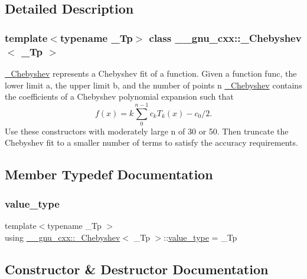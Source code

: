 \subsection{Detailed Description}
\subsubsection*{template$<$typename \+\_\+\+Tp$>$\newline
class \+\_\+\+\_\+gnu\+\_\+cxx\+::\+\_\+\+Chebyshev$<$ \+\_\+\+Tp $>$}

\hyperlink{class____gnu__cxx_1_1__Chebyshev}{\+\_\+\+Chebyshev} represents a Chebyshev fit of a function. Given a function {\ttfamily func}, the lower limit {\ttfamily a}, the upper limit {\ttfamily b}, and the number of points {\ttfamily n} \hyperlink{class____gnu__cxx_1_1__Chebyshev}{\+\_\+\+Chebyshev} contains the coefficients of a Chebyshev polynomial expansion such that \[ f(x) = k\sum_{0}^{n-1} c_k T_k(x) - c_0/2. \] Use these constructors with moderately large n of 30 or 50. Then truncate the Chebyshev fit to a smaller number of terms to satisfy the accuracy requirements. 

\subsection{Member Typedef Documentation}
\mbox{\label{class____gnu__cxx_1_1__Chebyshev_a7346ba5843311126dc28cb905687c4a1}} 
\subsubsection{\texorpdfstring{value\+\_\+type}{value\_type}}
{\footnotesize\ttfamily template$<$typename \+\_\+\+Tp $>$ \\
using \hyperlink{class____gnu__cxx_1_1__Chebyshev}{\+\_\+\+\_\+gnu\+\_\+cxx\+::\+\_\+\+Chebyshev}$<$ \+\_\+\+Tp $>$\+::\hyperlink{class____gnu__cxx_1_1__Chebyshev_a7346ba5843311126dc28cb905687c4a1}{value\+\_\+type} =  \+\_\+\+Tp}



\subsection{Constructor \& Destructor Documentation}
\mbox{\label{class____gnu__cxx_1_1__Chebyshev_aa68f563831ae3f7afb2596d38e078291}} 
